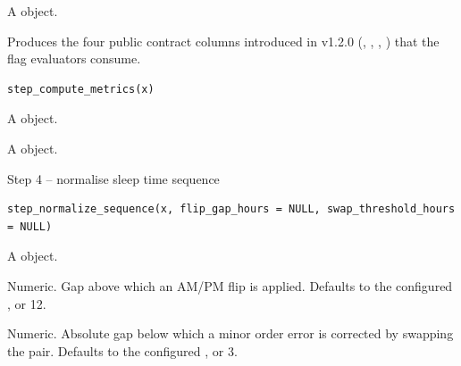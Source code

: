 \documentclass[a4paper]{book}
\begin{document}
%
\begin{Value}
A  object.
\end{Value}
%
\begin{Description}
Produces the four public contract columns introduced in v1.2.0
(, , ,
) that the flag evaluators consume.
\end{Description}
%
\begin{Usage}
\begin{verbatim}
step_compute_metrics(x)
\end{verbatim}
\end{Usage}
%
\begin{Arguments}
\begin{ldescription}
\item[\code{x}] A  object.
\end{ldescription}
\end{Arguments}
%
\begin{Value}
A  object.
\end{Value}
%
\begin{Description}
Step 4 -- normalise sleep time sequence
\end{Description}
%
\begin{Usage}
\begin{verbatim}
step_normalize_sequence(x, flip_gap_hours = NULL, swap_threshold_hours = NULL)
\end{verbatim}
\end{Usage}
%
\begin{Arguments}
\begin{ldescription}
\item[\code{x}] A  object.

\item[\code{flip\_gap\_hours}] Numeric. Gap above which an AM/PM flip is applied.
Defaults to the configured , or 12.

\item[\code{swap\_threshold\_hours}] Numeric. Absolute gap below which a minor
order error is corrected by swapping the pair. Defaults to the
configured , or 3.
\end{ldescription}
\end{Arguments}
\end{document}
